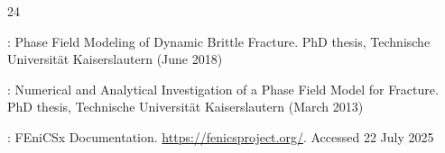 \documentclass[pdflatex,sn-mathphys-num]{sn-jnl}%
\theoremstyle{thmstyleone}%
\theoremstyle{thmstyletwo}%
\theoremstyle{thmstylethree}%
\begin{document}
\begin{thebibliography}{24}
\begin{botherref}
:
Phase {{Field Modeling}} of {{Dynamic Brittle Fracture}}.
PhD thesis,
Technische Universit\"at Kaiserslautern
(June 2018)
\end{botherref}
\endbibitem

\begin{botherref}
:
Numerical and {{Analytical Investigation}} of a {{Phase Field Model}} for {{Fracture}}.
PhD thesis,
Technische Universit\"at Kaiserslautern
(March 2013)
\end{botherref}
\endbibitem

\begin{botherref}
:
FEniCSx Documentation.
\url{https://fenicsproject.org/}.
Accessed 22 July 2025
\end{botherref}
\endbibitem

\end{thebibliography}
\end{document}
